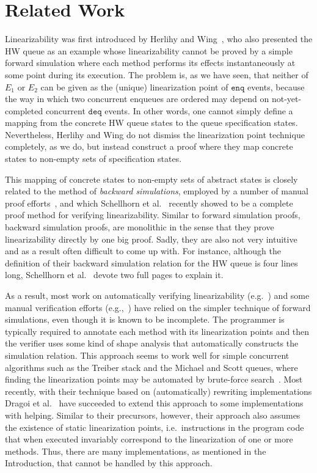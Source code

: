 \documentclass{LMCS}
\newcommand{\enq}{\ensuremath{\mathtt{enq}}}
\newcommand{\deq}{\ensuremath{\mathtt{deq}}}
\begin{document}
\section{Related Work}
\label{sec:related-work}

Linearizability was first introduced by Herlihy and Wing~\cite{HW1990}, who
also presented the HW queue as an example whose linearizability cannot be proved
by a simple forward simulation where each method performs its effects
instantaneously at some point during its execution.
The problem is, as we have seen, that neither of $E_1$ or $E_2$ can be given
as the (unique) linearization point of $\enq$ events, because the way in which
two concurrent enqueues are ordered may depend on not-yet-completed concurrent
$\deq$ events.  In other words, one cannot simply define a mapping from the
concrete HW queue states to the queue specification states. 
Nevertheless, Herlihy and Wing do not dismiss the linearization point technique
completely, as we do, but instead construct a proof where they map concrete
states to non-empty sets of specification states.  

This mapping of concrete states to non-empty sets of abstract states is closely
related to the method of \emph{backward simulations}, employed by a number of
manual proof efforts~\cite{CDG2005,DM2009,SWD2012}, 
and which Schellhorn et al.~\cite{SWD2012} recently showed to be a complete
proof method for verifying linearizability.
Similar to forward simulation proofs, backward simulation proofs, are monolithic 
in the sense that they prove linearizability directly by one big proof.
Sadly, they are also not very intuitive and as a result often difficult to come
up with. For instance, although the definition of their backward simulation
relation for the HW queue is four lines long, Schellhorn et al.~\cite{SWD2012}
devote two full pages to explain it.

As a result, most work on automatically verifying linearizability
(e.g.~\cite{ARR+2007,Vaf2009,Vaf2010,AHH+2013,DGH2013}) and some
manual verification efforts (e.g.,~\cite{DSW2011,CDG2005}) have relied on the simpler
technique of forward simulations, even though it is known to be incomplete.
The programmer is typically required to annotate each method with its
linearization points and then the verifier uses some kind of shape analysis
that automatically constructs the simulation relation. 
This approach seems to work well for simple concurrent algorithms such as the
Treiber stack and the Michael and Scott queues, where finding the linearization
points may be automated by brute-force search~\cite{Vaf2010}.
Most recently, with their technique based on (automatically) rewriting implementations Dragoi et al.~\cite{DGH2013} have succeeded to extend this approach to some implementations with helping.
Similar to their precursors, however, their approach also assumes the existence of static linearization points, i.e.\ instructions in the program code that when executed invariably correspond to the linearization of one or more methods.
Thus, there are many implementations, as mentioned in the Introduction, that cannot be handled by this approach.
\end{document}
